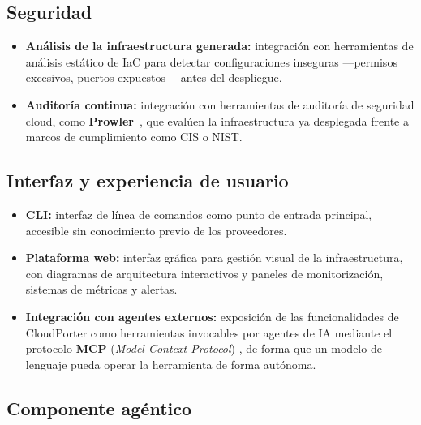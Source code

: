 \subsection{Seguridad}

\begin{itemize}
    \item \textbf{Análisis de la infraestructura generada:} integración con
    herramientas de análisis estático de IaC para detectar configuraciones
    inseguras —permisos excesivos, puertos expuestos— antes del despliegue.

    \item \textbf{Auditoría continua:} integración con herramientas de auditoría
    de seguridad cloud, como \textbf{Prowler}~\cite{prowler}, que evalúen la
    infraestructura ya desplegada frente a marcos de cumplimiento como CIS o NIST.
\end{itemize}

\subsection{Interfaz y experiencia de usuario}

\begin{itemize}
    \item \textbf{CLI:} interfaz de línea de comandos como punto de entrada
    principal, accesible sin conocimiento previo de los proveedores.

    \item \textbf{Plataforma web:} interfaz gráfica para gestión visual de la
    infraestructura, con diagramas de arquitectura interactivos y paneles
    de monitorización, sistemas de métricas y alertas.

    \item \textbf{Integración con agentes externos:} exposición de las
    funcionalidades de CloudPorter como herramientas invocables por agentes
    de IA mediante el protocolo \hyperlink{mcp}{\textbf{MCP}} (\textit{Model Context Protocol})
    \cite{mcpDocs}, de forma que un modelo de lenguaje pueda operar la
    herramienta de forma autónoma.
\end{itemize}

\subsection{Componente agéntico}

